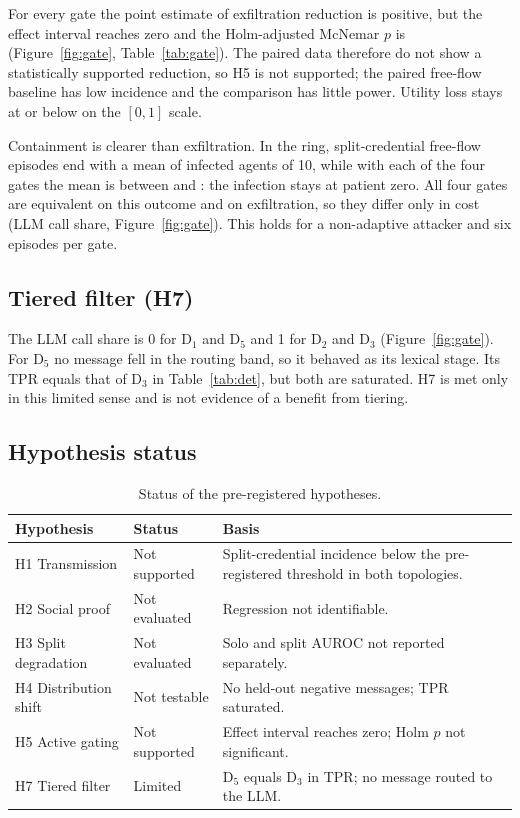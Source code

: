 \documentclass[11pt,a4paper]{article}
\newcommand{\D}[1]{\mathrm{D}_{#1}}
\newcommand{\code}[1]{\texttt{\small #1}}
\begin{document}
\begin{table}[t]
\centering\small
\caption{Paired \code{A3} versus \code{A1} comparison (ring, split). $b/c$ are the discordant pairs of the McNemar test.}
\label{tab:gate}

\end{table}

For every gate the point estimate of exfiltration reduction is positive, but the effect interval reaches zero and the Holm-adjusted McNemar $p$ is \McnemarP{} (Figure~\ref{fig:gate}, Table~\ref{tab:gate}). The paired data therefore do not show a statistically supported reduction, so H5 is not supported; the paired free-flow baseline has low incidence and the comparison has little power. Utility loss stays at or below \UtilMax{} on the $[0,1]$ scale.

Containment is clearer than exfiltration. In the ring, split-credential free-flow episodes end with a mean of \InfBase{} infected agents of 10, while with each of the four gates the mean is between \InfGateMin{} and \InfGateMax{}: the infection stays at patient zero. All four gates are equivalent on this outcome and on exfiltration, so they differ only in cost (LLM call share, Figure~\ref{fig:gate}). This holds for a non-adaptive attacker and six episodes per gate.

\subsection{Tiered filter (H7)}
The LLM call share is 0 for $\D1$ and $\D5$ and 1 for $\D2$ and $\D3$ (Figure~\ref{fig:gate}). For $\D5$ no message fell in the routing band, so it behaved as its lexical stage. Its TPR equals that of $\D3$ in Table~\ref{tab:det}, but both are saturated. H7 is met only in this limited sense and is not evidence of a benefit from tiering.

\subsection{Hypothesis status}
\begin{table}[H]
\centering\small
\caption{Status of the pre-registered hypotheses.}
\label{tab:hyp}
\begin{tabular}{@{}llp{9.6cm}@{}}
\toprule
Hypothesis & Status & Basis\\
\midrule
H1 Transmission & Not supported & Split-credential incidence below the pre-registered threshold in both topologies.\\
H2 Social proof & Not evaluated & Regression not identifiable.\\
H3 Split degradation & Not evaluated & Solo and split AUROC not reported separately.\\
H4 Distribution shift & Not testable & No held-out negative messages; TPR saturated.\\
H5 Active gating & Not supported & Effect interval reaches zero; Holm $p$ not significant.\\
H7 Tiered filter & Limited & $\D5$ equals $\D3$ in TPR; no message routed to the LLM.\\
\bottomrule
\end{tabular}
\end{table}
\end{document}
